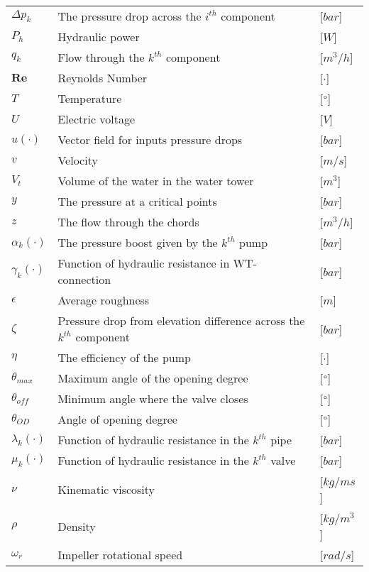 \begin{tabular}{l l l}
	$\Delta p_k$		&	The pressure drop across the $i^{th}$ component      		& [$bar$]\\
	$P_h$				&	Hydraulic power									      		& [$W$]\\
	$q_k$				&	Flow through the $k^{th}$ component 		     			& [$m^3/h$]\\
	$\bm{Re}$			&	Reynolds Number								     			& [$\cdot$]\\
	$T$					&	Temperature									     			& [$\degree$]\\
	$U$					&	Electric voltage 											& [$V$]\\
	$u(\cdot)$			&	Vector field for inputs pressure drops 						& [$bar$]\\
	$v$					&	Velocity									     			& [$m/s$]\\
	$V_t$				&	Volume of the water in the water tower						& [$m^3$]\\
	$y$					&	The pressure at a critical points							& [$bar$]\\	
	$z$					&	The flow through the chords									& [$m^3/h$]\\
	$\alpha_k(\cdot)$	&	The pressure boost given by the	$k^{th}$ pump				& [$bar$]\\
	$\gamma_k(\cdot)$	&	Function of hydraulic resistance in WT-connection			& [$bar$]\\
	$\epsilon$			&	Average roughness									     	& [$m$]\\
	$\zeta$				&	Pressure drop from elevation difference across the $k^{th}$ component	& [$bar$]\\
	$\eta$				&	The efficiency of the pump								   	& [$\cdot$]\\
	$\theta_{max}$		&	Maximum angle of the opening degree						    & [$\degree$]\\
	$\theta_{off}$		&	Minimum angle where the valve closes						& [$\degree$]\\
	$\theta_{OD}$		&	Angle of opening degree										& [$\degree$]\\
	$\lambda_k(\cdot)$	&	Function of hydraulic resistance in the $k^{th}$ pipe		& [$bar$]\\
	$\mu_k(\cdot)$		&	Function of hydraulic resistance in the $k^{th}$ valve		& [$bar$]\\
	$\nu$				&	Kinematic viscosity									     	& [$kg/ms$]\\
	$\rho$				&	Density									     				& [$kg/m^3$]\\
	$\omega_r$			&	Impeller rotational speed									& [$rad/s$]\\	
\end{tabular}

